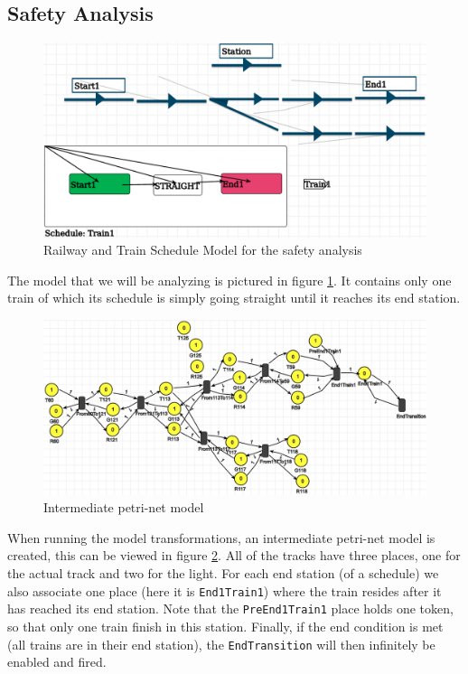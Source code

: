 \documentclass{article}
\begin{document}
\subsection*{Safety Analysis}

\begin{figure}[H]
    \centering
    \includegraphics[width=\textwidth]{images/example_pn.png}
    \caption{Railway and Train Schedule Model for the safety analysis}
    \label{example_pn}
\end{figure}

The model that we will be analyzing is pictured in figure \ref{example_pn}. It contains only one train of which its schedule is simply going straight until it reaches its end station.

\begin{figure}[H]
    \centering
    \includegraphics[width=\textwidth]{images/example_pn_pn.png}
    \caption{Intermediate petri-net model}
    \label{example_pn_pn}
\end{figure}

When running the model transformations, an intermediate petri-net model is created, this can be viewed in figure \ref{example_pn_pn}. All of the tracks have three places, one for the actual track and two for the light. For each end station (of a schedule) we also associate one place (here it is \texttt{End1Train1}) where the train resides after it has reached its end station. Note that the \texttt{PreEnd1Train1} place holds one token, so that only one train finish in this station. Finally, if the end condition is met (all trains are in their end station), the \texttt{EndTransition} will then infinitely be enabled and fired.
\end{document}
